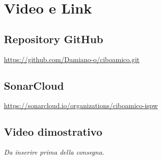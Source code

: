 \chapter{Video e Link}
\label{cap:links}

\section{Repository GitHub}
\url{https://github.com/Damiano-o/ciboamico.git}

\section{SonarCloud}
\url{https://sonarcloud.io/organizations/ciboamico-ispw}

\section{Video dimostrativo}
\emph{Da inserire prima della consegna.}